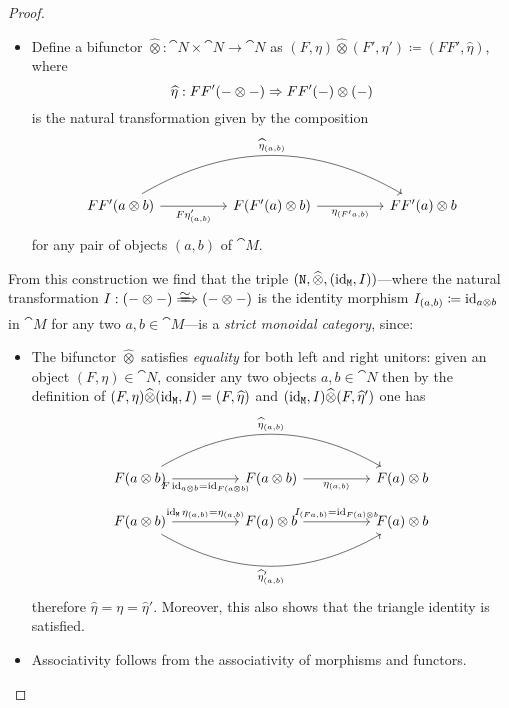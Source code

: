 \documentclass[../../deep-dive]{subfiles}
\begin{document}
\begin{proof}
\begin{itemize}
\item Define a bifunctor \(\widehat\otimes: \cat N \times \cat N \to \cat N\) as
  \((F, \eta) \widehat\otimes (F', \eta') \coloneq (F F', \widehat\eta)\), where
  \[
  \widehat\eta: F F'(- \otimes -) \Rightarrow F F'(-) \otimes (-)
  \]
  is the natural transformation given by the composition
  \[
  \begin{tikzcd}
  F F'(a \otimes b)
  \ar[rr, "F \eta'_{(a, b)}"']
  \ar[rrrr, bend left, "\widehat\eta_{(a, b)}"]
  &
  &F (F'(a) \otimes b)
  \ar[rr, "\eta_{(F' a, b)}"']
  &
  &F F'(a) \otimes b
  \end{tikzcd}
  \]
  for any pair of objects \((a, b)\) of \(\cat M\).
\end{itemize}
From this construction we find that the triple
\((\texttt N, \widehat\otimes, (\operatorname{id}_{\texttt M}, I))\)---where the natural
transformation \(I: (- \otimes -) \isonat (- \otimes -)\) is the identity
morphism \(I_{(a, b)} \coloneq \operatorname{id}_{a \otimes b}\) in \(\cat M\) for any two
\(a, b \in \cat M\)---is a \emph{strict monoidal category}, since:
\begin{itemize}\setlength\itemsep{0em}
\item The bifunctor \(\widehat\otimes\) satisfies \emph{equality} for both left
  and right unitors: given an object \((F, \eta) \in \cat N\), consider any two
  objects \(a, b \in \cat N\) then by the definition of \((F, \eta)
  \widehat\otimes (\operatorname{id}_{\texttt M}, I) = (F, \widehat\eta)\) and \((\operatorname{id}_{\texttt M},
  I) \widehat\otimes (F, \widehat\eta')\) one has
  \[
  \begin{tikzcd}
  {F(a \otimes b)} \ar[rr, "F \Id_{a \otimes b} = \Id_{F(a \otimes b)}"']
  \ar[rrrr, bend left, "\widehat\eta_{(a, b)}"]
  &&{F(a \otimes b)} \ar[rr, "\eta_{(a, b)}"']
  &&{F(a) \otimes b}
  \end{tikzcd}
  \]
  \[
  \begin{tikzcd}
  {F(a \otimes b)} \ar[rr, "\Id_{\cat M} \eta_{(a, b)} = \eta_{(a, b)}"]
  \ar[rrrr, bend right, "\widehat\eta'_{(a, b)}"']
  &&{F(a) \otimes b} \ar[rr, "I_{(Fa, b)} = \Id_{F(a) \otimes b}"]
  &&{F(a) \otimes b}
  \end{tikzcd}
  \]
  therefore \(\widehat\eta = \eta = \widehat\eta'\). Moreover, this also shows
  that the triangle identity is satisfied.

\item Associativity follows from the associativity of morphisms and functors.
\end{itemize}


\end{proof}
\end{document}
